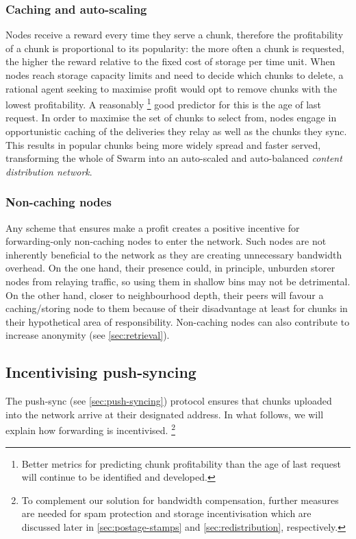 \subsubsection{Caching and auto-scaling}\label{sec:caching}

Nodes receive a reward every time they serve a chunk, therefore the profitability of a chunk is proportional to its popularity: the more often a chunk is requested, the higher the reward relative to the fixed cost of storage per time unit. When nodes reach storage capacity limits and need to decide which chunks to delete, a rational agent seeking to maximise profit would opt to remove chunks with the lowest profitability. A reasonably%
%
\footnote{Better metrics for predicting chunk profitability than the age of last request will continue to be identified and developed.}
good predictor for this is the age of last request. In order to maximise the set of chunks to select from, nodes engage in opportunistic caching of the deliveries they relay as well as the chunks they sync. This results in popular chunks being more widely spread and faster served, transforming the whole of Swarm into an auto-scaled and auto-balanced \emph{content distribution network}.


\subsubsection{Non-caching nodes}

Any scheme that ensures  make a profit creates a positive incentive for forwarding-only non-caching nodes to enter the network. Such nodes are not inherently beneficial to the network as they are creating unnecessary bandwidth overhead. On the one hand, their presence could, in principle, unburden storer nodes from relaying traffic, so using them in shallow bins may not be detrimental. On the other hand, closer to neighbourhood depth, their peers will favour a caching/storing node to them because of their disadvantage at least for chunks in their hypothetical area of responsibility. Non-caching nodes can also contribute to increase anonymity (see \ref{sec:retrieval}).

\subsection{Incentivising push-syncing\statusgreen}\label{sec:push-sync-incentives}

\green{}

The push-sync (see \ref{sec:push-syncing}) protocol ensures that chunks uploaded into the network arrive at their designated address. In what follows, we will explain how forwarding is incentivised.
%
%
\footnote{To complement our solution for bandwidth compensation, further measures are needed for spam protection and storage incentivisation which are discussed later in \ref{sec:postage-stamps} and \ref{sec:redistribution}, respectively.}



